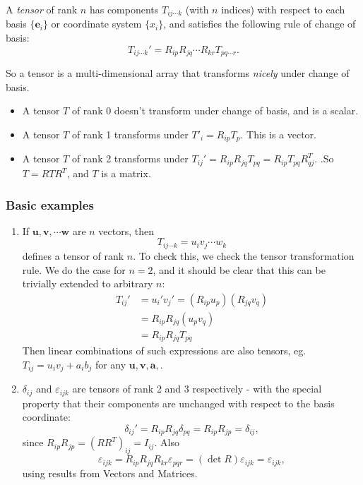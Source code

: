 \documentclass[a4paper]{article}
\begin{document}
\begin{defi}[Tensor]
  A \emph{tensor} of rank $n$ has components $T_{ij\cdots k}$ (with $n$ indices) with respect to each basis $\{\mathbf{e}_i\}$ or coordinate system $\{x_i\}$, and satisfies the following rule of change of basis:
  \[
    T_{ij\cdots k}' = R_{ip}R_{jq}\cdots R_{kr}T_{pq\cdots r}.
  \]
\end{defi}
So a tensor is a multi-dimensional array that transforms \emph{nicely} under change of basis.

\begin{eg}\leavevmode
  \begin{itemize}
    \item A tensor $T$ of rank 0 doesn't transform under change of basis, and is a scalar.
    \item A tensor $T$ of rank 1 transforms under $T'_i = R_{ip}T_p$. This is a vector.
    \item A tensor $T$ of rank 2 transforms under $T_{ij}' = R_{ip} R_{jq} T_{pq} = R_{ip} T_{pq} R^T_{qj}$. .So $T = RTR^T$, and $T$ is a matrix.
  \end{itemize}
\end{eg}

\subsubsection{Basic examples}
\begin{eg}\leavevmode
  \begin{enumerate}
    \item If $\mathbf{u}, \mathbf{v}, \cdots\mathbf{w}$ are $n$ vectors, then
      \[
        T_{ij\cdots k} =u_i v_j \cdots w_k
      \]
      defines a tensor of rank $n$. To check this, we check the tensor transformation rule. We do the case for $n = 2$, and it should be clear that this can be trivially extended to arbitrary $n$:
      \begin{align*}
        T_{ij}' &= u_i'v_j' = (R_{ip} u_p)(R_{jq}v_q)\\
        &= R_{ip}R_{jq}(u_p v_q)\\
        &= R_{ip}R_{jq}T_{pq}
      \end{align*}
      Then linear combinations of such expressions are also tensors, eg. $T_{ij} = u_i v_j + a_ib_j$ for any $\mathbf{u}, \mathbf{v}, \mathbf{a},\mathbf{ }$.
    \item $\delta_{ij}$ and $\varepsilon_{ijk}$ are tensors of rank 2 and 3 respectively - with  the special property that their components are unchanged with respect to the basis coordinate:
      \[
        \delta_{ij}' = R_{ip}R_{jq}\delta_{pq} = R_{ip}R_{jp} = \delta_{ij},
      \]
      since $R_{ip}R_{jp} = (RR^T)_{ij} = I_{ij}$. Also
      \[
        \varepsilon_{ijk} = R_{ip}R_{jq}R_{kr}\varepsilon_{pqr} = (\det R)\varepsilon_{ijk} = \varepsilon_{ijk},
      \]
      using results from Vectors and Matrices.
  \end{enumerate}
\end{eg}
\end{document}
